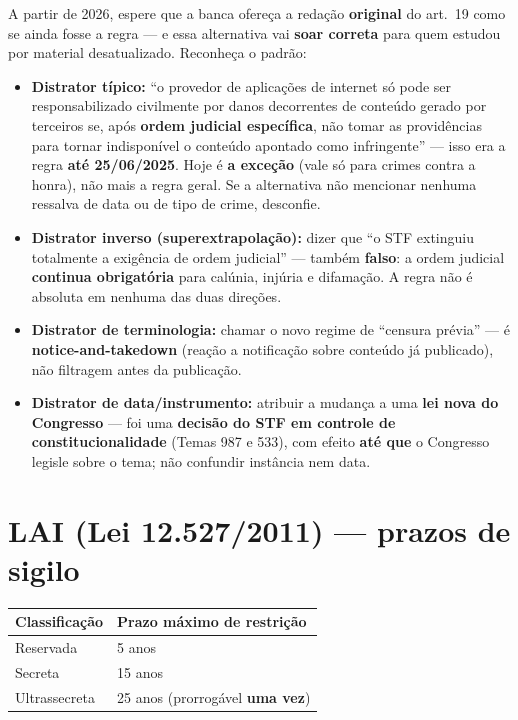 \begin{pegadinha}
A partir de 2026, espere que a banca ofereça a redação \textbf{original} do
art.\ 19 como se ainda fosse a regra --- e essa alternativa vai \textbf{soar
correta} para quem estudou por material desatualizado. Reconheça o padrão:

\begin{itemize}
\item \textbf{Distrator típico:} ``o provedor de aplicações de internet só
pode ser responsabilizado civilmente por danos decorrentes de conteúdo
gerado por terceiros se, após \textbf{ordem judicial específica}, não tomar
as providências para tornar indisponível o conteúdo apontado como
infringente'' --- isso era a regra \textbf{até 25/06/2025}. Hoje é
\textbf{a exceção} (vale só para crimes contra a honra), não mais a regra
geral. Se a alternativa não mencionar nenhuma ressalva de data ou de tipo de
crime, desconfie.
\item \textbf{Distrator inverso (superextrapolação):} dizer que ``o STF
extinguiu totalmente a exigência de ordem judicial'' --- também
\textbf{falso}: a ordem judicial \textbf{continua obrigatória} para calúnia,
injúria e difamação. A regra não é absoluta em nenhuma das duas direções.
\item \textbf{Distrator de terminologia:} chamar o novo regime de
``censura prévia'' --- é \textbf{notice-and-takedown} (reação a notificação
sobre conteúdo já publicado), não filtragem antes da publicação.
\item \textbf{Distrator de data/instrumento:} atribuir a mudança a uma
\textbf{lei nova do Congresso} --- foi uma \textbf{decisão do STF em controle
de constitucionalidade} (Temas 987 e 533), com efeito \textbf{até que} o
Congresso legisle sobre o tema; não confundir instância nem data.
\end{itemize}
\end{pegadinha}

\section{LAI (Lei 12.527/2011) --- prazos de sigilo}

\begin{center}
\begin{tabular}{@{}p{4cm}p{6cm}@{}}
\toprule
\textbf{Classificação} & \textbf{Prazo máximo de restrição} \\
\midrule
Reservada & 5 anos \\
Secreta & 15 anos \\
Ultrassecreta & 25 anos (prorrogável \textbf{uma vez}) \\
\bottomrule
\end{tabular}
\end{center}

